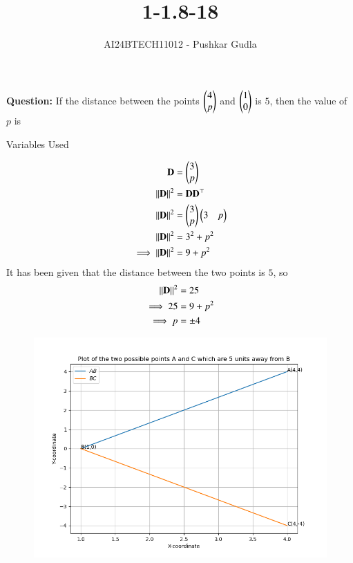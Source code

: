\documentclass[journal]{IEEEtran}
\begin{document}

\vspace{3cm}

\title{1-1.8-18}
\author{AI24BTECH11012 - Pushkar Gudla}
{\let\newpage\relax\maketitle}

\renewcommand{\thefigure}{\theenumi}
\renewcommand{\thetable}{\theenumi}
\setlength{\intextsep}{10pt} %


\renewcommand{\thetable}{\theenumi}
\textbf{Question:} If the distance between the points $\begin{pmatrix}4\\p\end{pmatrix}$ and $\begin{pmatrix}1\\0\end{pmatrix}$ is $5$, then the value of $p$ is
\solution
\begin{table}[h!]    
  \centering
  
  \caption{Variables Used}
  \label{tab 1.8.18}
\end{table}
\begin{align}
	\mathbf{D}	&= \begin{pmatrix}3\\p\end{pmatrix} \\
	\left\lVert\mathbf{D}\right\rVert^2 &= \mathbf{D}\mathbf{D}^\top \\
	\left\lVert\mathbf{D}\right\rVert^2 &= \begin{pmatrix}3\\p\end{pmatrix}\begin{pmatrix}3 & p\end{pmatrix} \\
	\left\lVert\mathbf{D}\right\rVert^2 &= 3^2 + p^2 \\
	\implies \left\lVert\mathbf{D}\right\rVert^2 &= 9 + p^2
\end{align}
It has been given that the distance between the two points is $5$, so \\
\begin{align}
	\left\lVert\mathbf{D}\right\rVert^2 &= 25 \\
	\implies 25 &= 9 + p^2 \\
	\implies p &= \pm 4
\end{align}
\begin{figure}[h]
	\centering
	\includegraphics[scale=0.6]{figs/plot.png}
	\label{Fig}
\end{figure}
\end{document}

